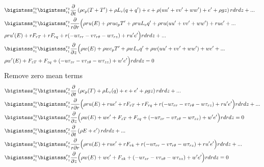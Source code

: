 \documentclass[10pt,a4paper]{article}
\begin{document}
\begin{align}
&\begin{split}
&\bigintsss_{z_1}^{z_2} \bigintsss_{r_1}^{r_2}\frac{\partial}{\partial t} \left(\rho c_p(T+T')+\rho L_v(q+q')+e+\rho(uu'+vv'+ww')+e'+\rho gz\right)r dr dz +...\\
&\bigintsss_{z_1}^{z_2} \bigintsss_{r_1}^{r_2}\frac{\partial }{r\partial r}\Big(\rho r u(E)+\rho r uc_pT'+\rho r uL_vq'+\rho r u(uu'+vv'+ww')+ r u e'+...\\
&\rho r u'(E)+rF_{rT}+ rF_{rq}+ r(-u\tau_{rr} -v\tau_{r \theta}-w\tau_{r z})+r u'e'\Big)r dr dz+...\\
&\bigintsss_{z_1}^{z_2} \bigintsss_{r_1}^{r_2}\frac{\partial}{\partial z}\Big(\rho  w(E)+\rho  wc_pT'+\rho  wL_vq'+\rho w(uu'+vv'+ww')+ w e'+...\\
&\rho  w'(E)+F_{zT}+ F_{zq}+ (-u\tau_{zr} -v\tau_{z \theta}-w\tau_{z z})+ w'e'\Big)r dr dz= 0
\end{split}
\end{align}
Remove zero mean terms
\begin{align}
&\begin{split}
&\bigintsss_{z_1}^{z_2} \bigintsss_{r_1}^{r_2}\frac{\partial}{\partial t} \left(\rho c_p(T)+\rho L_v(q)+e+e'+\rho gz\right)r dr dz +...\\
&\bigintsss_{z_1}^{z_2} \bigintsss_{r_1}^{r_2}\frac{\partial }{r\partial r}\Big(\rho r u(E)+ r u e'+rF_{rT}+ rF_{rq}+ r(-u\tau_{rr} -v\tau_{r \theta}-w\tau_{r z})+ r u'e'\Big)r dr dz+...\\
&\bigintsss_{z_1}^{z_2} \bigintsss_{r_1}^{r_2}\frac{\partial}{\partial z}\Big(\rho  w(E)+  w e'+F_{zT}+ F_{zq}+ (-u\tau_{zr} -v\tau_{z \theta}-w\tau_{z z})+  w'e'\Big)r dr dz= 0
\end{split}\\
&\begin{split}
&\bigintsss_{z_1}^{z_2} \bigintsss_{r_1}^{r_2}\frac{\partial}{\partial t} \left(\rho E+e'\right)r dr dz +...\\
&\bigintsss_{z_1}^{z_2} \bigintsss_{r_1}^{r_2}\frac{\partial }{r\partial r}\Big(\rho r u(E)+ r u e'+rF_{rk}+  r(-u\tau_{rr} -v\tau_{r \theta}-w\tau_{r z})+r u'e'\Big)r dr dz+...\\
&\bigintsss_{z_1}^{z_2} \bigintsss_{r_1}^{r_2}\frac{\partial}{\partial z}\Big(\rho  w(E)+ w e'+F_{zk}+ (-u\tau_{zr} -v\tau_{z \theta}-w\tau_{z z})+ w'e'\Big)r dr dz= 0
\end{split}\\
\end{align}
\end{document}
